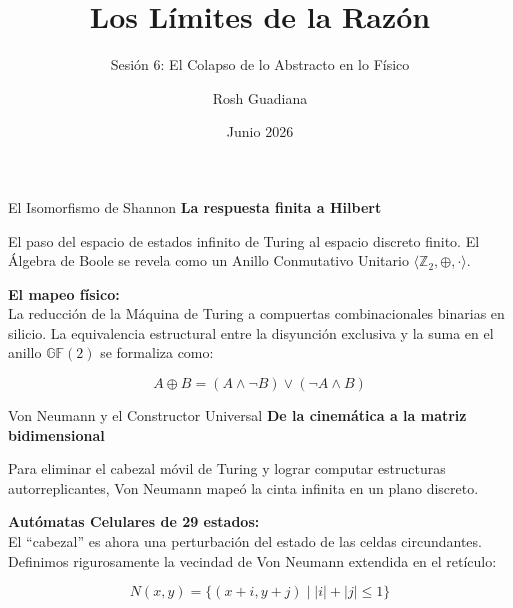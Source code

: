 \documentclass[10pt, aspectratio=169]{beamer}
\title{Los Límites de la Razón}
\subtitle{Sesión 6: El Colapso de lo Abstracto en lo Físico}
\author{Rosh Guadiana}
\date{Junio 2026}
\begin{document}
\maketitle


\begin{frame}{El Isomorfismo de Shannon}
    \vspace{0.3cm}
    \Large \textbf{La respuesta finita a Hilbert}
    
    \vspace{0.4cm}
    \normalsize
    El paso del espacio de estados infinito de Turing al espacio discreto finito. El Álgebra de Boole se revela como un Anillo Conmutativo Unitario $\langle \mathbb{Z}_2, \oplus, \cdot \rangle$.
    
    \vspace{0.5cm}
    \alert{\textbf{El mapeo físico:}} \\
    La reducción de la Máquina de Turing a compuertas combinacionales binarias en silicio. La equivalencia estructural entre la disyunción exclusiva y la suma en el anillo $\mathbb{GF}(2)$ se formaliza como:
    
    \vspace{0.4cm}
    \Large
    $$A \oplus B = (A \land \neg B) \lor (\neg A \land B)$$
\end{frame}


\begin{frame}{Von Neumann y el Constructor Universal}
    \vspace{0.3cm}
    \Large \textbf{De la cinemática a la matriz bidimensional}
    
    \vspace{0.4cm}
    \normalsize
    Para eliminar el cabezal móvil de Turing y lograr computar estructuras autorreplicantes, Von Neumann mapeó la cinta infinita en un plano discreto. 
    
    \vspace{0.5cm}
    \alert{\textbf{Autómatas Celulares de 29 estados:}} \\
    El ``cabezal'' es ahora una perturbación del estado de las celdas circundantes. Definimos rigurosamente la vecindad de Von Neumann extendida en el retículo:
    
    \vspace{0.4cm}
    \Large
    $$N(x,y) = \{(x+i, y+j) \mid |i| + |j| \le 1\}$$
\end{frame}
\end{document}
